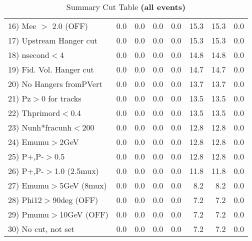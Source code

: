 \begin{table}[h!]
{{\begin{tabular}{||l||r|r|r|r|r||r||r||}
 16) Mee $>$ 2.0  (OFF)   &       0.0 &       0.0 &       0.0 &       0.0 &      15.3 &      15.3 &       0.0 \\
 17) Upstream Hanger cut  &       0.0 &       0.0 &       0.0 &       0.0 &      15.3 &      15.3 &       0.0 \\
 18) nsecond$<$4          &       0.0 &       0.0 &       0.0 &       0.0 &      14.8 &      14.8 &       0.0 \\
 19) Fid. Vol. Hanger cut &       0.0 &       0.0 &       0.0 &       0.0 &      14.7 &      14.7 &       0.0 \\
 20) No Hangers fromPVert &       0.0 &       0.0 &       0.0 &       0.0 &      13.7 &      13.7 &       0.0 \\
 21) Pz$>$0 for tracks    &       0.0 &       0.0 &       0.0 &       0.0 &      13.5 &      13.5 &       0.0 \\
 22) Thprimord$<$0.4      &       0.0 &       0.0 &       0.0 &       0.0 &      13.5 &      13.5 &       0.0 \\
 23) Nunh*fracunh$<$200   &       0.0 &       0.0 &       0.0 &       0.0 &      12.8 &      12.8 &       0.0 \\
 24) Emumu$>$2GeV         &       0.0 &       0.0 &       0.0 &       0.0 &      12.8 &      12.8 &       0.0 \\
 25) P+,P-$>$0.5          &       0.0 &       0.0 &       0.0 &       0.0 &      12.8 &      12.8 &       0.0 \\
 26) P+,P-$>$1.0 (2.5mux) &       0.0 &       0.0 &       0.0 &       0.0 &      11.8 &      11.8 &       0.0 \\
 27) Emumu$>$5GeV  (8mux) &       0.0 &       0.0 &       0.0 &       0.0 &       8.2 &       8.2 &       0.0 \\
 28) Phi12$>$90deg  (OFF) &       0.0 &       0.0 &       0.0 &       0.0 &       7.2 &       7.2 &       0.0 \\
 29) Pmumu$>$10GeV  (OFF) &       0.0 &       0.0 &       0.0 &       0.0 &       7.2 &       7.2 &       0.0 \\
 30) No cut, not set      &       0.0 &       0.0 &       0.0 &       0.0 &       7.2 &       7.2 &       0.0 \\
 \hline
 \hline
 \end{tabular}
 \caption{Summary Cut Table \textbf{ (all events)}}
 \label{tab-sumcut}
 }}
 \end{table}
 \endinput
